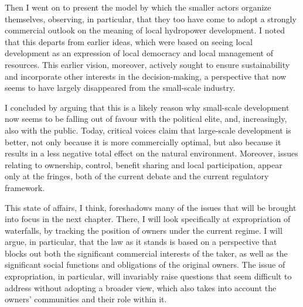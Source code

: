 Then I went on to present the model by which the smaller actors organize themselves, observing, in particular, that they too have come to adopt a strongly commercial outlook on the meaning of local hydropower development. I noted that this departs from earlier ideas, which were based on seeing local development as an expression of local democracy and local management of resources. This earlier vision, moreover, actively sought to ensure sustainability and incorporate other interests in the decision-making, a perspective that now seems to have largely disappeared from the small-scale industry.

I concluded by arguing that this is a likely reason why small-scale development now seems to be falling out of favour with the political elite, and, increasingly, also with the public. Today, critical voices claim that large-scale development is better, not only because it is more commercially optimal, but also because it results in a less negative total effect on the natural environment. Moreover, issues relating to ownership, control, benefit sharing and local participation, appear only at the fringes, both of the current debate and the current regulatory framework. 

This state of affairs, I think, foreshadows many of the issues that will be brought into focus in the next chapter. There, I will look specifically at expropriation of waterfalls, by tracking the position of owners under the current regime. I will argue, in particular, that the law as it stands is based on a perspective that blocks out both the significant commercial interests of the taker, as well as the significant social functions and obligations of the original owners. The issue of expropriation, in particular, will invariably raise questions that seem difficult to address without adopting a broader view, which also takes into account the owners' communities and their role within it.